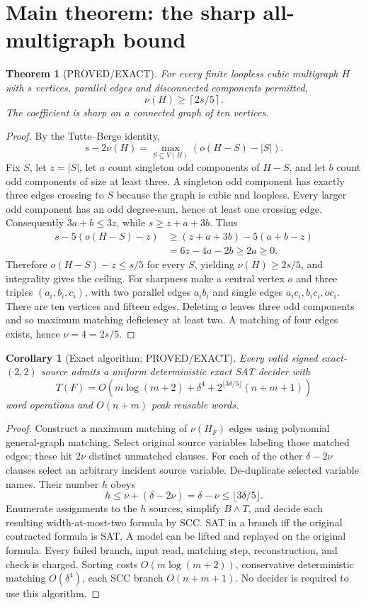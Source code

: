 \documentclass[11pt]{article}
\newtheorem{theorem}{Theorem}
\newtheorem{corollary}{Corollary}
\begin{document}
\section{Main theorem: the sharp all-multigraph bound}
\begin{theorem}[PROVED/EXACT]
For every finite loopless cubic multigraph $H$ with $s$ vertices, parallel edges and disconnected components permitted,
\[
\boxed{\nu(H)\ge\left\lceil 2s/5\right\rceil.}
\]
The coefficient is sharp on a connected graph of ten vertices.
\end{theorem}
\begin{proof}
By the Tutte--Berge identity,
\[
s-2\nu(H)=\max_{S\subseteq V(H)}(o(H-S)-|S|).
\]
Fix $S$, let $z=|S|$, let $a$ count singleton odd components of $H-S$, and let $b$ count odd components of size at least three. A singleton odd component has exactly three edges crossing to $S$ because the graph is cubic and loopless. Every larger odd component has an odd degree-sum, hence at least one crossing edge. Consequently $3a+b\le3z$, while $s\ge z+a+3b$. Thus
\[
\begin{split}
s-5(o(H-S)-z)
&\ge(z+a+3b)-5(a+b-z)\\
&=6z-4a-2b\ge 2a\ge0.
\end{split}
\]
Therefore $o(H-S)-z\le s/5$ for every $S$, yielding $\nu(H)\ge 2s/5$, and integrality gives the ceiling.
For sharpness make a central vertex $o$ and three triples $(a_i,b_i,c_i)$, with two parallel edges $a_ib_i$ and single edges $a_ic_i,b_ic_i,oc_i$. There are ten vertices and fifteen edges. Deleting $o$ leaves three odd components and so maximum matching deficiency at least two. A matching of four edges exists, hence $\nu=4=2s/5$.
\end{proof}
\begin{corollary}[Exact algorithm; PROVED/EXACT]
Every valid signed exact-$(2,2)$ source admits a uniform deterministic exact SAT decider with
\[
\boxed{T(F)=O(m\log(m+2)+\delta^4+
2^{\lfloor3\delta/5\rfloor}(n+m+1))}
\]
word operations and $O(n+m)$ peak reusable words.
\end{corollary}
\begin{proof}
Construct a maximum matching of $\nu(H_F)$ edges using polynomial general-graph matching. Select original source variables labeling those matched edges; these hit $2\nu$ distinct unmatched clauses. For each of the other $\delta-2\nu$ clauses select an arbitrary incident source variable. De-duplicate selected variable names. Their number $h$ obeys
\[
h\le\nu+(\delta-2\nu)=\delta-\nu
\le\lfloor3\delta/5\rfloor.
\]
Enumerate assignments to the $h$ sources, simplify $B\wedge T$, and decide each resulting width-at-most-two formula by SCC. SAT in a branch iff the original contracted formula is SAT. A model can be lifted and replayed on the original formula. Every failed branch, input read, matching step, reconstruction, and check is charged. Sorting costs $O(m\log(m+2))$, conservative deterministic matching $O(\delta^4)$, each SCC branch $O(n+m+1)$. No decider is required to use this algorithm.
\end{proof}
\end{document}
